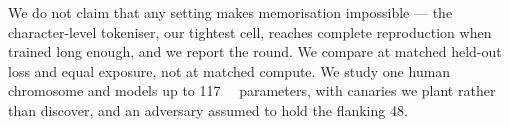 We do not claim that any setting makes memorisation impossible --- the character-level tokeniser,
our tightest cell, reaches complete reproduction when trained long enough, and we report the round.
We compare at matched held-out loss and equal exposure, not at matched compute. We study one human
chromosome and models up to \SI{117}{\mega\nothing} parameters, with canaries we plant rather than
discover, and an adversary assumed to hold the flanking 48\nt{}.
